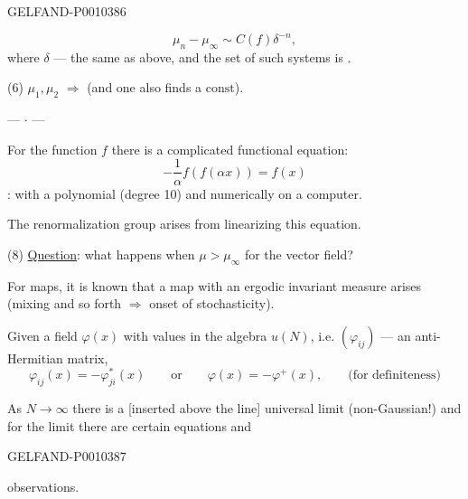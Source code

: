 \begin{GelfandAdjacentEvidence}{GELFAND-P001038}{6}


\begin{equation*}
\mu_n-\mu_\infty\sim C(f)\delta^{-n},
\tag{5}
\end{equation*}
where $\delta$ --- the same as above,
and the set of such systems is .


(6) $\mu_1,\mu_2$ $\Rightarrow$ 
(and one also finds a $\mathrm{const}$).

\begin{center}--- $\cdot$ ---\end{center}

For the function $f$ there is a complicated functional equation:
\begin{equation*}
-\frac1\alpha f(f(\alpha x))=f(x)
\tag{7}
\end{equation*}
: with a polynomial (degree 10) and numerically on a computer.

The renormalization group arises from linearizing this equation.

(8) \underline{Question}: what happens when $\mu>\mu_\infty$ for the vector field?

For maps, it is known that a map with an ergodic invariant measure arises
(mixing and so forth $\Rightarrow$ onset of stochasticity).


Given a field $\varphi(x)$ with values in the algebra $u(N)$, i.e. $(\varphi_{ij})$ ---
an anti-Hermitian matrix,
\begin{equation*}
\varphi_{ij}(x)=-\varphi_{ji}^{*}(x)\qquad\text{or}\qquad
\varphi(x)=-\varphi^{+}(x),\qquad\text{(for definiteness)}
\tag{1}
\end{equation*}

As $N\to\infty$ there is a [inserted above the line] universal limit
(non-Gaussian!) and for the limit there are certain equations and
\end{GelfandAdjacentEvidence}
\begin{GelfandAdjacentEvidence}{GELFAND-P001038}{7}

observations.
\end{GelfandAdjacentEvidence}


